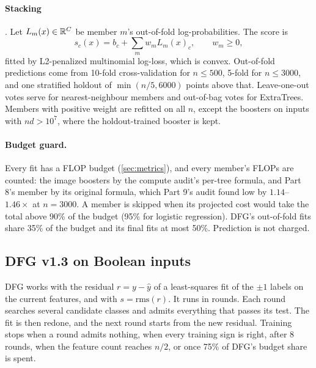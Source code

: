 \paragraph{Stacking} \cite{wolpert1992stacked}. Let $L_m(x)\in\mathbb{R}^C$ be member $m$'s out-of-fold log-probabilities. The score is
\[
s_c(x)=b_c+\textstyle\sum_m w_m L_m(x)_c,\qquad w_m\ge0 ,
\]
fitted by L2-penalized multinomial log-loss, which is convex. Out-of-fold predictions come from 10-fold cross-validation for $n\le500$, 5-fold for $n\le3000$, and one stratified holdout of $\min(n/5,6000)$ points above that. Leave-one-out votes serve for nearest-neighbour members and out-of-bag votes for ExtraTrees. Members with positive weight are refitted on all $n$, except the boosters on inputs with $nd>10^7$, where the holdout-trained booster is kept.

\paragraph{Budget guard.} Every fit has a FLOP budget (\cref{sec:metrics}), and every member's FLOPs are counted: the image boosters by the compute audit's per-tree formula, and Part 8's  member by its original formula, which Part 9's audit found low by $1.14$--$1.46\times$ at $n=3000$. A member is skipped when its projected cost would take the total above 90\% of the budget (95\% for logistic regression). DFG's out-of-fold fits share 35\% of the budget and its final fits at most 50\%. Prediction is not charged.

\subsection{DFG v1.3 on Boolean inputs}\label{sec:dfg}

DFG works with the residual $r=y-\hat y$ of a least-squares fit of the $\pm1$ labels on the current features, and with $s=\mathrm{rms}(r)$. It runs in rounds. Each round searches several candidate classes and admits everything that passes its test. The fit is then redone, and the next round starts from the new residual. Training stops when a round admits nothing, when every training sign is right, after 8 rounds, when the feature count reaches $n/2$, or once 75\% of DFG's budget share is spent.


